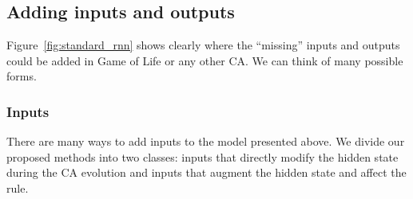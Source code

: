 \subsection{Adding inputs and outputs\label{sec:adding-inputs-outp}}

Figure~\ref{fig:standard_rnn} shows clearly where the ``missing'' inputs and
outputs could be added in Game of Life or any other CA\@. We can think of many
possible forms.

\subsubsection{Inputs}
There are many ways to add inputs to the model presented above. We divide our
proposed methods into two classes: inputs that directly modify the hidden state
during the CA evolution and inputs that augment the hidden state and affect the
rule.

